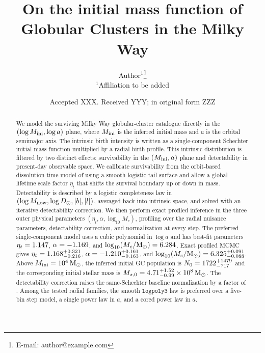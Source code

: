 \documentclass[fleqn,usenatbib]{mnras}
\title[On the initial mass function of GCs in the MW]{On the initial mass function of Globular Clusters in the Milky Way}
\author[Author]{
Author$^{1}$\thanks{E-mail: author@example.com} \\
$^{1}$Affiliation to be added
}
\date{Accepted XXX. Received YYY; in original form ZZZ}
\begin{document}


\label{firstpage}
\pagerange{\pageref{firstpage}--\pageref{lastpage}}
\maketitle

\begin{abstract}
We model the surviving Milky Way globular-cluster catalogue directly in the $(\log M_{\rm ini}, \log a)$ plane, where $M_{\rm ini}$ is the inferred initial mass and $a$ is the orbital semimajor axis. The intrinsic birth intensity is written as a single-component Schechter initial mass function multiplied by a radial birth profile. This intrinsic distribution is filtered by two distinct effects: survivability in the $(M_{\rm ini},a)$ plane and detectability in present-day observable space. We calibrate survivability from the orbit-based dissolution-time model of \citet{Baumgardt2019} using a smooth logistic-tail surface and allow a global lifetime scale factor $\eta_t$ that shifts the survival boundary up or down in mass. Detectability is described by a logistic completeness law in $(\log M_{\rm now}, \log D_\odot, |b|, |l|)$, averaged back into intrinsic space, and solved with an iterative detectability correction. We then perform exact profiled inference in the three outer physical parameters $(\eta_t, \alpha, \log_{10} M_c)$, profiling over the radial nuisance parameters, detectability correction, and normalization at every step. The preferred single-component model uses a cubic polynomial in $\log a$ and has best-fit parameters $\eta_t=1.147$, $\alpha=-1.169$, and $\log_{10}(M_c/{\rm M}_\odot)=6.284$. Exact profiled MCMC gives $\eta_t=1.168_{-0.216}^{+0.321}$, $\alpha=-1.210_{-0.163}^{+0.161}$, and $\log_{10}(M_c/{\rm M}_\odot)=6.325_{-0.088}^{+0.091}$. Above $M_{\rm ini}=10^4\,{\rm M}_\odot$, the inferred initial GC population is $N_0=1722_{-717}^{+1479}$ and the corresponding initial stellar mass is $M_{\star,0}=4.71_{-0.99}^{+1.52}\times10^8\,{\rm M}_\odot$. The detectability correction raises the same-Schechter baseline normalization by a factor of \ExactCountRatio. Among the tested radial families, the smooth $\texttt{logpoly3}$ law is preferred over a five-bin step model, a single power law in $a$, and a cored power law in $a$.
\end{abstract}
\end{document}
